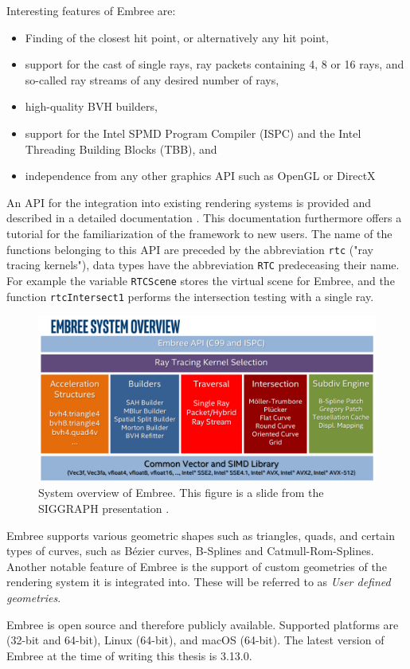 Interesting features of Embree are:
\begin{itemize}
	\setlength\itemsep{0.05em}
	\item 	Finding of the closest hit point, or alternatively any hit point,
	\item 	support for the cast of single rays, ray packets containing 4, 8 or 16 rays, and so-called ray streams of any desired number of rays,
	\item 	high-quality BVH builders,
	\item 	support for the Intel SPMD Program Compiler (ISPC) and the Intel Threading Building Blocks (TBB), and
	\item 	independence from any other graphics API such as OpenGL or DirectX
\end{itemize}

An API for the integration into existing rendering systems is provided and described in a detailed documentation \cite{embree2021Doc}. This documentation furthermore offers a tutorial for the familiarization of the framework to new users. The name of the functions belonging to this API are preceded by the abbreviation \texttt{rtc} ("ray tracing kernels"), data types have the abbreviation \texttt{RTC} predeceasing their name. For example the variable \texttt{RTCScene} stores the virtual scene for Embree, and the function \texttt{rtcIntersect1} performs the intersection testing with a single ray.

\begin{figure}
	\centering
	\includegraphics[width=1\linewidth]{img/1 fundamentals/embree_overview.png}
	\caption{System overview of Embree. This figure is a slide from the SIGGRAPH presentation  \cite{embreeSlides}.}
	\label{fig:embree}
\end{figure}

Embree supports various geometric shapes such as triangles, quads, and certain types of curves, such as Bézier curves, B-Splines and Catmull-Rom-Splines.
Another notable feature of Embree is the support of custom geometries of the rendering system it is integrated into. These will be referred to as \emph{User defined geometries}.

Embree is open source and therefore publicly available. Supported platforms are (32-bit and 64-bit), Linux (64-bit), and macOS (64-bit). The latest version of Embree at the time of writing this thesis is 3.13.0. 